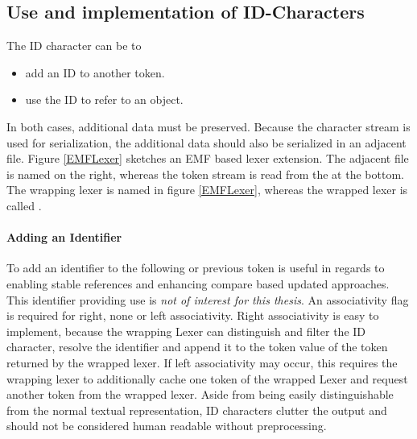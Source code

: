 \subsection{Use and implementation of ID-Characters}
 
The ID character can be to
\begin{itemize}
	\item add an ID to another token.
	\item use the ID to refer to an object.
\end{itemize}
In both cases, additional data must be preserved. Because the character stream is used for serialization, the additional data should also be serialized in an adjacent file. Figure \ref{EMFLexer} sketches an EMF based lexer extension. The adjacent file is named  on the right, whereas the token stream is read from the  at the bottom. The wrapping lexer is named  in figure \ref{EMFLexer}, whereas the wrapped lexer is called .  

\paragraph{Adding an Identifier} To add an identifier to the following or previous token is useful in regards to enabling stable references and enhancing compare based updated approaches. This identifier providing use is \emph{not of interest for this thesis}. An associativity flag is required for right, none or left associativity.  Right associativity is easy to implement, because the wrapping Lexer can distinguish and filter the ID character, resolve the identifier and append it to the token value of the token returned by the wrapped lexer. If left associativity may occur, this requires the wrapping lexer to additionally cache one token of the wrapped Lexer and request another token from the wrapped lexer. Aside from being easily distinguishable from the normal textual representation, ID characters clutter the output and should not be considered human readable without preprocessing. 
 
